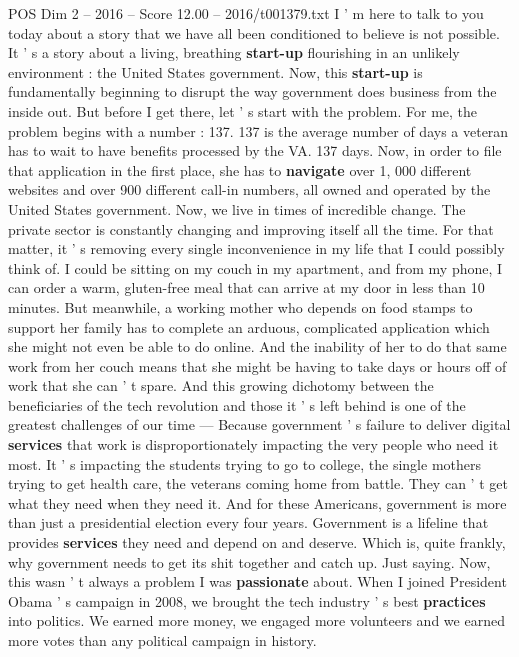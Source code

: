 \begin{textsample}{POS Dim 2 – 2016 – Score 12.00 – 2016/t001379.txt}  \label{ex:f2_pos_043}
I ' m here to talk to you today about a story that we have all been conditioned to believe is not possible.
It ' s a story about a living, breathing \textbf{start-up} flourishing in an unlikely environment : the United States government.
Now, this \textbf{start-up} is fundamentally beginning to disrupt the way government does business from the inside out.
But before I get there, let ' s start with the problem.
For me, the problem begins with a number : 137. 137 is the average number of days a veteran has to wait to have benefits processed by the VA. 137 days.
Now, in order to file that application in the first place, she has to \textbf{navigate} over 1, 000 different websites and over 900 different call-in numbers, all owned and operated by the United States government.
Now, we live in times of incredible change.
The private sector is constantly changing and improving itself all the time.
For that matter, it ' s removing every single inconvenience in my life that I could possibly think of.
I could be sitting on my couch in my apartment, and from my phone, I can order a warm, gluten-free meal that can arrive at my door in less than 10 minutes.
But meanwhile, a working mother who depends on food stamps to support her family has to complete an arduous, complicated application which she might not even be able to do online.
And the inability of her to do that same work from her couch means that she might be having to take days or hours off of work that she can ' t spare.
And this growing dichotomy between the beneficiaries of the tech revolution and those it ' s left behind is one of the greatest challenges of our time — Because government ' s failure to deliver digital \textbf{services} that work is disproportionately impacting the very people who need it most.
It ' s impacting the students trying to go to college, the single mothers trying to get health care, the veterans coming home from battle.
They can ' t get what they need when they need it.
And for these Americans, government is more than just a presidential election every four years.
Government is a lifeline that provides \textbf{services} they need and depend on and deserve.
Which is, quite frankly, why government needs to get its shit together and catch up.
Just saying.
Now, this wasn ' t always a problem I was \textbf{passionate} about.
When I joined President Obama ' s campaign in 2008, we brought the tech industry ' s best \textbf{practices} into politics.
We earned more money, we engaged more volunteers and we earned more votes than any political campaign in history.

\end{textsample}
